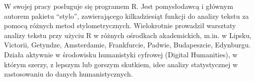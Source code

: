 \documentclass[\main/boa.tex]{subfiles}
\begin{document}
W swojej pracy posługuje się programem R. Jest pomysłodawcą i głównym autorem pakietu “stylo”, zawierającego kilkadziesiąt funkcji do analizy tekstu za pomocą różnych metod stylometrycznych. Wielokrotnie prowadził warsztaty analizy tekstu przy użyciu R w różnych ośrodkach akademickich, m.in. w Lipsku, Victorii, Getyndze, Amsterdamie, Frankfurcie, Padwie, Budapeszcie, Edynburgu. Działa aktywnie w środowisku humanistyki cyfrowej (Digital Humanities), w którym szerzy, z lepszym lub gorszym skutkiem, idee analizy statystycznej w zastosowaniu do danych humanistycznych.
\end{document}
